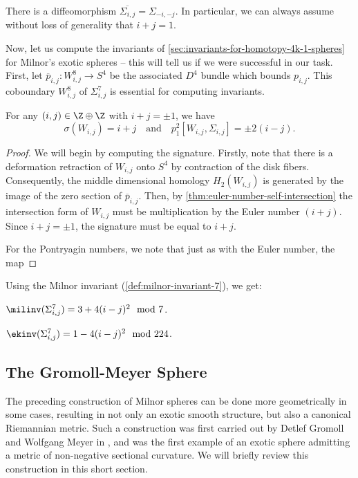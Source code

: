 \begin{proposition}
	There is a diffeomorphism $\overline{\Sigma_{i,j}}=\Sigma_{-i,-j}$. In particular, we can always assume without loss of generality that $i+j=1$.
\end{proposition}

Now, let us compute the invariants of \cref{sec:invariants-for-homotopy-4k-1-spheres} for Milnor's exotic spheres -- this will tell us if we were successful in our task. First, let $\overline{p}_{i,j} : W_{i,j}^8 \to S^4$ be the associated $D^4$ bundle which bounds $p_{i,j}$. This coboundary $W_{i,j}^8$ of $\Sigma^7_{i,j}$ is essential for computing invariants.

\begin{proposition}
	For any $(i,j)\in \Z\oplus \Z$ with $i+j=\pm 1$, we have
	\[
		\sigma(W_{i,j}) = i+j\quad\textrm{and}\quad p_1^2[W_{i,j}, \Sigma_{i,j}]=\pm 2(i-j).
	\]
\end{proposition}
\begin{proof}
	We will begin by computing the signature. Firstly, note that there is a deformation retraction of $W_{i,j}$ onto $S^4$ by contraction of the disk fibers. Consequently, the middle dimensional homology $H_2(W_{i,j})$ is generated by the image of the zero section of $\overline{p}_{i,j}$. Then, by \cref{thm:euler-number-self-intersection} the intersection form of $W_{i,j}$ must be multiplication by the Euler number $(i+j)$. Since $i+j=\pm 1$, the signature must be equal to $i+j$.

	For the Pontryagin numbers, we note that just as with the Euler number, the map
\end{proof}

Using the Milnor invariant (\cref{def:milnor-invariant-7}), we get:
\begin{corollary}
	$\milinv(\Sigma^7_{i,j})=3+4(i-j)^2\mod 7$.
\end{corollary}


\begin{corollary}
	$\ekinv(\Sigma^7_{i,j})=1-4(i-j)^2\mod 224$.
\end{corollary}

\subsection{The Gromoll-Meyer Sphere}\label{sec:gromoll-meyer}

The preceding construction of Milnor spheres can be done more geometrically in some cases, resulting in not only an exotic smooth structure, but also a canonical Riemannian metric. Such a construction was first carried out by Detlef Gromoll and Wolfgang Meyer in \cite{gromollmeyer1974curvature}, and was the first example of an exotic sphere admitting a metric of non-negative sectional curvature. We will briefly review this construction in this short section.

